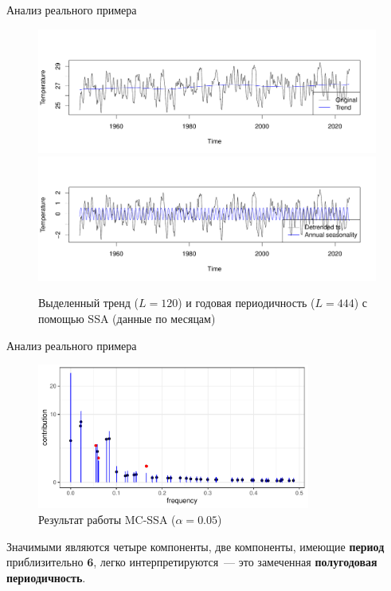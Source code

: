 \documentclass[pdf,notheorems,10pt,intlimits,unicode]{beamer}
\begin{document}
\begin{frame}{Анализ реального примера}
  \begin{figure}
    \centering
    \includegraphics[width=\textwidth]{img/Nino_reconstruct_trend_slides.pdf}\vspace{-2.8em}
    \includegraphics[width=\textwidth]{img/Nino_reconstruct_season_slides.pdf}\vspace{-1em}
    \caption{Выделенный тренд ($L=120$) и годовая периодичность ($L=444$) с помощью SSA (данные по месяцам)}
  \end{figure}
\end{frame}

\begin{frame}{Анализ реального примера}
  \begin{figure}[h!]
    \centering
    \includegraphics[width=0.8\textwidth]{img/Nino_mcssa.pdf}
    \caption{Результат работы MC-SSA ($\alpha=0.05$)}
    \label{Nino_mcssa}
  \end{figure}
  Значимыми являются четыре компоненты, две компоненты, имеющие \textbf{период} приблизительно $\mathbf{6}$, легко интерпретируются~---  это замеченная \textbf{полугодовая периодичность}.
\end{frame}
\end{document}
